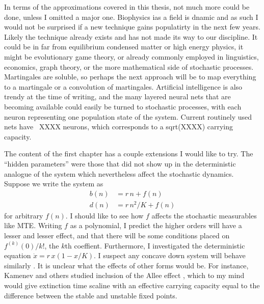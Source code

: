 In terms of the approximations covered in this thesis, not much more could be done, unless I omitted a major one. 
Biophysics ias a field is dnamic and as such I would not be surprised if a new technique gains populatirty in the next few years. 
Likely the technique already exists and has not made its way to our discipline. 
It could be in far from equilibrium condensed matter or high energy physics, it might be evolutionary game theory, or already commonly employed in linguistics, economics, graph theory, or the more mathematical side of stochastic processes. 
Martingales are soluble, so perhaps the next approach will be to map everything to a martingale or a convolution of martingales. 
Artificial intelligence is also trendy at the time of writing, and the many layered neural nets that are becoming available could easily be turned to stochastic processes, with each neuron representing one population state of the system. 
Current routinely used nets have ~XXXX neurons, which corresponds to a sqrt(XXXX) carrying capacity. 

The content of the first chapter has a couple extensions I would like to try. 
The ``hidden parameters'' were those that did not show up in the deterministic analogue of the system which nevertheless affect the stochastic dynamics. 
Suppose we write the system as
\begin{align*}
	b(n) &= r\,n + f(n) \\
	d(n) &= r\,n^2/K + f(n)
\end{align*}
for arbitrary $f(n)$. I should like to see how $f$ affects the stochastic measurables like MTE. 
Writing $f$ as a polynomial, I predict the higher orders will have a lesser and lesser effect, and that there will be some conditions placed on $f^{(k)}(0)/k!$, the $k$th coeffient. 
Furthermore, I investigated the deterministic equation $\dot{x} = r\,x(1-x/K)$. I suspect any concave down system will behave similarly \cite{Strogatz?}. 
It is unclear what the effects of other forms would be. 
For instance, Kamenev and others studied inclusion of the Allee effect \cite{Kamenev?}, which to my mind would give extinction time scaline with an effective carrying capacity equal to the difference between the stable and unstable fixed points. 

